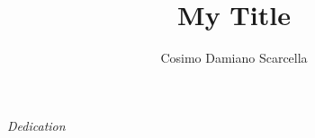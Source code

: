 \documentclass[12pt,a4paper]{book}
\author{Cosimo Damiano Scarcella}
\title{My Title}
\date{}
\begin{document}

\newpage\null\thispagestyle{empty}\newpage %

\maketitle
\newpage\null\thispagestyle{empty}\newpage %

\frontmatter
{}

\begin{flushright}
\null{}
\textit{Dedication}
\null
\end{flushright}
\newpage
\newpage


\mainmatter


\appendix 


\listoffigures
\listoftables 

\frontmatter
{}
\nocite{*}



\tableofcontents
\end{document}
